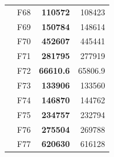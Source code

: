 \begin{table}[]
\begin{tabular}{ll|r|r|}
\multicolumn{1}{|l|}{\cellcolor[HTML]{ECF4FF}}                           & \cellcolor[HTML]{FCE6AB}F68     & \cellcolor[HTML]{D3FFB6}\textbf{110572}                        & 108423                                                    \\ \cline{2-4} 
\multicolumn{1}{|l|}{\cellcolor[HTML]{ECF4FF}}                           & \cellcolor[HTML]{FCE6AB}F69     & \cellcolor[HTML]{D3FFB6}\textbf{150784}                        & 148614                                                    \\ \cline{2-4} 
\multicolumn{1}{|l|}{\cellcolor[HTML]{ECF4FF}}                           & \cellcolor[HTML]{FCE6AB}F70     & \cellcolor[HTML]{D3FFB6}\textbf{452607}                        & 445441                                                    \\ \cline{2-4} 
\multicolumn{1}{|l|}{\cellcolor[HTML]{ECF4FF}}                           & \cellcolor[HTML]{FCE6AB}F71     & \cellcolor[HTML]{D3FFB6}\textbf{281795}                        & 277919                                                    \\ \cline{2-4} 
\multicolumn{1}{|l|}{\cellcolor[HTML]{ECF4FF}}                           & \cellcolor[HTML]{FCE6AB}F72     & \cellcolor[HTML]{D3FFB6}\textbf{66610.6}                       & 65806.9                                                   \\ \cline{2-4} 
\multicolumn{1}{|l|}{\cellcolor[HTML]{ECF4FF}}                           & \cellcolor[HTML]{FCE6AB}F73     & \cellcolor[HTML]{D3FFB6}\textbf{133906}                        & 133560                                                    \\ \cline{2-4} 
\multicolumn{1}{|l|}{\cellcolor[HTML]{ECF4FF}}                           & \cellcolor[HTML]{FCE6AB}F74     & \cellcolor[HTML]{D3FFB6}\textbf{146870}                        & 144762                                                    \\ \cline{2-4} 
\multicolumn{1}{|l|}{\cellcolor[HTML]{ECF4FF}}                           & \cellcolor[HTML]{FCE6AB}F75     & \cellcolor[HTML]{D3FFB6}\textbf{234757}                        & 232794                                                    \\ \cline{2-4} 
\multicolumn{1}{|l|}{\cellcolor[HTML]{ECF4FF}}                           & \cellcolor[HTML]{FCE6AB}F76     & \cellcolor[HTML]{D3FFB6}\textbf{275504}                        & 269788                                                    \\ \cline{2-4} 
\multicolumn{1}{|l|}{\cellcolor[HTML]{ECF4FF}}                           & \cellcolor[HTML]{FCE6AB}F77     & \cellcolor[HTML]{D3FFB6}\textbf{620630}                        & 616128                                                    \\ \cline{2-4} 

\end{tabular}
\end{table}
